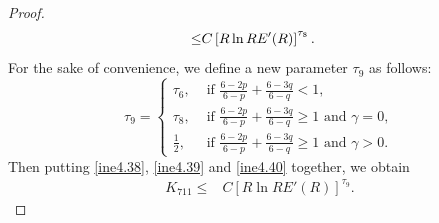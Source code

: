 \documentclass[10pt,a4paper]{amsart}
\begin{document}
\begin{proof}
\begin{align}
\leq&C\left[R\ln RE'(R)\right]^{\tau_8}.\notag
\end{align}
For the sake of convenience, we define a new parameter $\tau_9$ as follows:
\begin{equation*}
\tau_9=
\begin{cases}
\tau_6, & \text{ if  }\frac{6-2p}{6-p} + \frac{6-3q}{6-q} < 1, \\
\tau_8, & \text{ if  } \frac{6-2p}{6-p} + \frac{6-3q}{6-q}\geq1\text{ and }\gamma=0,\\
\frac{1}{2}, & \text{ if  } \frac{6-2p}{6-p} + \frac{6-3q}{6-q}\geq1\text{ and }\gamma>0.
\end{cases}
\end{equation*}
Then putting \eqref{ine4.38}, \eqref{ine4.39} and \eqref{ine4.40} together, we obtain
\begin{align}\label{ine4.41}
K_{711}\leq&C\left[R\ln RE'(R)\right]^{\tau_9}.
\end{align}



\end{proof}
\end{document}
